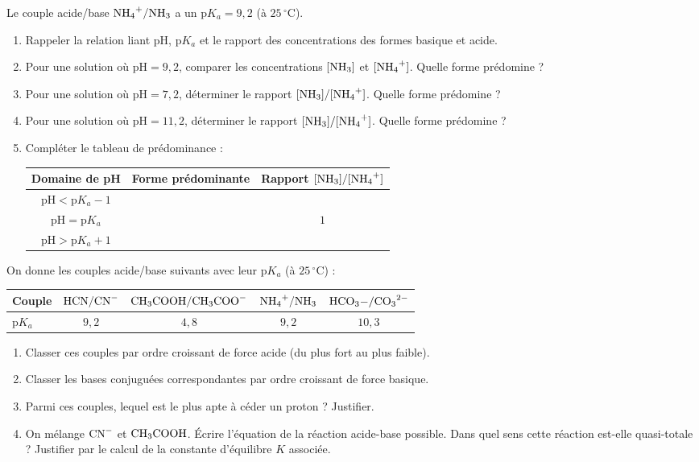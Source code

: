 \documentclass[11pt]{article}
\begin{document}
\begin{exercice}[Relation $\text{pH} = \text{p}K_a$ et domaines de prédominance]
Le couple acide/base $\ce{NH4+/NH3}$ a un $\text{p}K_a = 9,2$ (à $25\,^\circ\mathrm{C}$).
\begin{enumerate}
    \item Rappeler la relation liant $\text{pH}$, $\text{p}K_a$ et le rapport des concentrations des formes basique et acide.
    \item Pour une solution où $\text{pH} = 9,2$, comparer les concentrations $[\ce{NH3}]$ et $[\ce{NH4+}]$. Quelle forme prédomine ?
    \item Pour une solution où $\text{pH} = 7,2$, déterminer le rapport $[\ce{NH3}]/[\ce{NH4+}]$. Quelle forme prédomine ?
    \item Pour une solution où $\text{pH} = 11,2$, déterminer le rapport $[\ce{NH3}]/[\ce{NH4+}]$. Quelle forme prédomine ?
    \item Compléter le tableau de prédominance :
    \begin{center}
    \begin{tabular}{|c|c|c|}
    \hline
    \textbf{Domaine de pH} & \textbf{Forme prédominante} & \textbf{Rapport $[\ce{NH3}]/[\ce{NH4+}]$} \\
    \hline
    $\text{pH} < \text{p}K_a - 1$ & & \\
    $\text{pH} = \text{p}K_a$ & & $1$ \\
    $\text{pH} > \text{p}K_a + 1$ & & \\
    \hline
    \end{tabular}
    \end{center}
\end{enumerate}
\end{exercice}

\begin{exercice}
On donne les couples acide/base suivants avec leur $\text{p}K_a$ (à $25\,^\circ\mathrm{C}$) :
\begin{center}
\begin{tabular}{lcccc}
\hline
Couple & $\ce{HCN/CN-}$ & $\ce{CH3COOH/CH3COO-}$ & $\ce{NH4+/NH3}$ & $\ce{HCO3-/CO3^2-}$ \\
\hline
$\text{p}K_a$ & $9,2$ & $4,8$ & $9,2$ & $10,3$ \\
\hline
\end{tabular}
\end{center}
\begin{enumerate}
    \item Classer ces couples par ordre croissant de force acide (du plus fort au plus faible).
    \item Classer les bases conjuguées correspondantes par ordre croissant de force basique.
    \item Parmi ces couples, lequel est le plus apte à céder un proton ? Justifier.
    \item On mélange $\ce{CN-}$ et $\ce{CH3COOH}$. Écrire l'équation de la réaction acide-base possible. Dans quel sens cette réaction est-elle quasi-totale ? Justifier par le calcul de la constante d'équilibre $K$ associée.
\end{enumerate}
\end{exercice}
\end{document}
